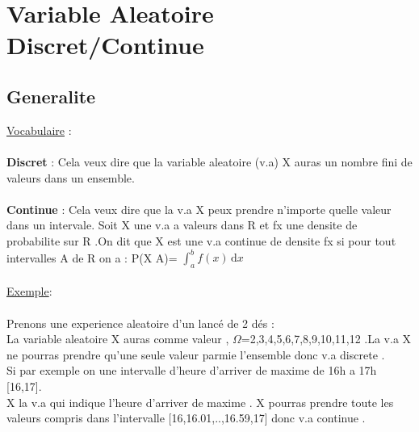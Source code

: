 \documentclass[a4paper,8pt,openany]{book}
\begin{document}
\section{Variable Aleatoire Discret/Continue}
\subsection{Generalite}
\underline{Vocabulaire} :\\
\\
\textbf{Discret} : Cela veux dire que la variable aleatoire (v.a) X auras un nombre fini de valeurs dans un ensemble.\\
\\
\textbf{Continue} : Cela veux dire que la v.a X peux prendre n'importe quelle valeur dans un intervale. Soit X une v.a a valeurs dans R et fx une densite de probabilite sur R .On dit que X est une v.a continue de densite fx si pour tout intervalles A de R on a : P(X \in A)= $ \int_a^b f(x) \, \mathrm dx$\\
\\
\underline{Exemple}:\\
\\
Prenons une experience aleatoire d'un lanc\'e de 2 d\'es :\\
La variable aleatoire X auras comme valeur , $\Omega$={2,3,4,5,6,7,8,9,10,11,12} .La v.a X ne pourras prendre qu'une seule valeur parmie l'ensemble donc v.a discrete .
\\
Si par exemple on une intervalle d'heure d'arriver de maxime de 16h a 17h [16,17].\\
X la v.a qui indique l'heure d'arriver de maxime . X pourras prendre toute les valeurs compris dans l'intervalle [16,16.01,..,16.59,17] donc v.a continue .
\end{document}
